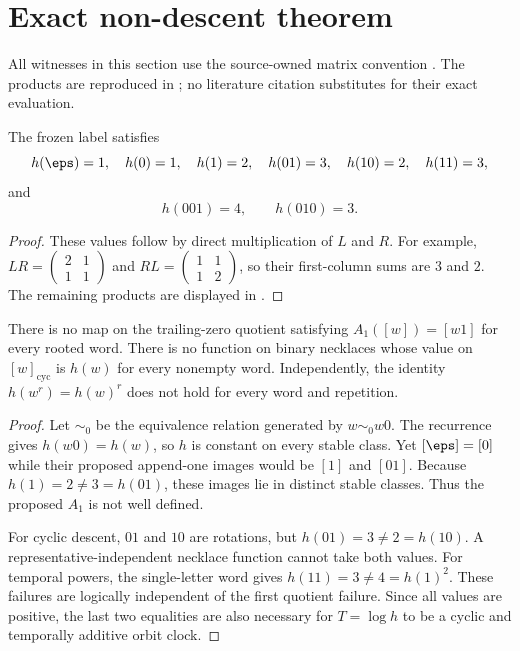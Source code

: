 \section{Exact non-descent theorem}
\label{sec:non-descent}

All witnesses in this section use the source-owned matrix convention
\citep{knauf1998spin,knauf1999erratum}.  The products are reproduced in
; no literature citation substitutes for their exact
evaluation.

\begin{lemma}
The frozen label satisfies
\[
 h(\eps)=1,\quad h(0)=1,\quad h(1)=2,\quad
 h(01)=3,\quad h(10)=2,\quad h(11)=3,
\]
and
\[
 h(001)=4,\qquad h(010)=3.
\]
\end{lemma}
\begin{proof}
These values follow by direct multiplication of $L$ and $R$.  For example,
$LR=\left(\begin{smallmatrix}2&1\\1&1\end{smallmatrix}\right)$ and
$RL=\left(\begin{smallmatrix}1&1\\1&2\end{smallmatrix}\right)$, so their
first-column sums are $3$ and $2$.  The remaining products are displayed in
.
\end{proof}

\begin{theorem}
\label{thm:rooted-clock}
There is no map on the trailing-zero quotient satisfying
$A_1([w])=[w1]$ for every rooted word.  There is no function on binary
necklaces whose value on $[w]_{\mathrm{cyc}}$ is $h(w)$ for every nonempty
word.  Independently, the identity $h(w^r)=h(w)^r$ does not hold for every
word and repetition.
\end{theorem}
\begin{proof}
Let $\sim_0$ be the equivalence relation generated by $w\sim_0w0$.  The
recurrence gives $h(w0)=h(w)$, so $h$ is constant on every stable class.  Yet
$[\eps]=[0]$ while their proposed append-one images would be $[1]$ and
$[01]$.  Because $h(1)=2\ne3=h(01)$, these images lie in distinct stable
classes.  Thus the proposed $A_1$ is not well defined.

For cyclic descent, $01$ and $10$ are rotations, but
$h(01)=3\ne2=h(10)$.  A representative-independent necklace function cannot
take both values.  For temporal powers, the single-letter word gives
$h(11)=3\ne4=h(1)^2$.  These failures are logically independent of the first
quotient failure.  Since all values are positive, the last two equalities are
also necessary for $T=\log h$ to be a cyclic and temporally additive orbit
clock.
\end{proof}


